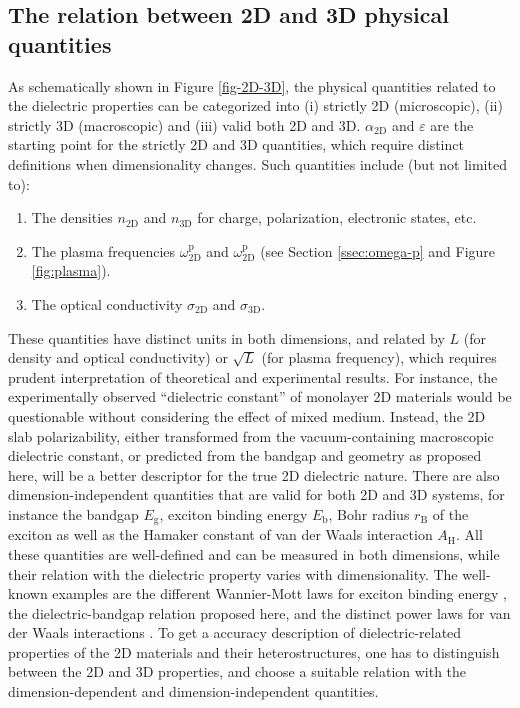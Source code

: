 \documentclass[journal=ancac3,email=true,hyperref=true,keywords=false]{achemso}
\begin{document}
\subsection{The relation between 2D and 3D physical quantities}
As schematically shown in Figure \ref{fig-2D-3D}, the physical
quantities related to the dielectric properties can be categorized
into (i) strictly 2D (microscopic), (ii) strictly 3D (macroscopic) and
(iii) valid both 2D and 3D.  $\alpha_{\mathrm{2D}}$ and $\varepsilon$ are the
starting point for the strictly 2D and 3D quantities, which require
distinct definitions when dimensionality changes. Such quantities
include (but not limited to):
\begin{enumerate}
\item The densities $n_{\mathrm{2D}}$ and $n_{\mathrm{3D}}$ for
  charge, polarization, electronic states, etc.
  
\item The plasma frequencies $\omega^{\mathrm{p}}_{\mathrm{2D}}$ and
  $\omega^{\mathrm{p}}_{\mathrm{2D}}$\cite{Nazarov_2015_2D_3D} (see
  Section \ref{ssec:omega-p} and Figure \ref{fig:plasma}).

\item The optical conductivity $\sigma_{\mathrm{2D}}$ and
  $\sigma_{\mathrm{3D}}$\cite{Bechstedt_2012,Matthes_2016}.
\end{enumerate}
These quantities have distinct units in both dimensions, and related
by $L$ (for density and optical conductivity) or $\sqrt{L}$ (for
plasma frequency), which requires prudent interpretation of
theoretical and experimental results. For instance, the experimentally
observed ``dielectric constant'' of monolayer 2D materials
\cite{Ning_2015,Li_2014,Yao_2014,Wu_2015} would be questionable
without considering the effect of mixed medium. Instead, the 2D slab
polarizability, either transformed from the vacuum-containing
macroscopic dielectric constant, or predicted from the bandgap and
geometry as proposed here, will be a better descriptor for the true 2D
dielectric nature. There are also
dimension-independent quantities that are valid for both 2D and 3D
systems, for instance the bandgap $E_{\mathrm{g}}$, exciton binding
energy $E_{\mathrm{b}}$, Bohr radius $r_{\mathrm{B}}$ of the exciton
as well as the Hamaker constant of van der Waals interaction
$A_{\mathrm{H}}$. All these quantities are well-defined and can be
measured in both dimensions, while their relation with the dielectric
property varies with dimensionality. The well-known examples are the
different Wannier-Mott laws for exciton binding energy
\cite{Olsen_2016_hydrogen}, the dielectric-bandgap relation
proposed here, and the distinct power laws for van der Waals
interactions \cite{Gobre_2013}. To get a accuracy description of
dielectric-related properties of the 2D materials and their
heterostructures, one has to distinguish between the 2D and 3D
properties, and choose a suitable relation with the
dimension-dependent and dimension-independent quantities.
\end{document}
